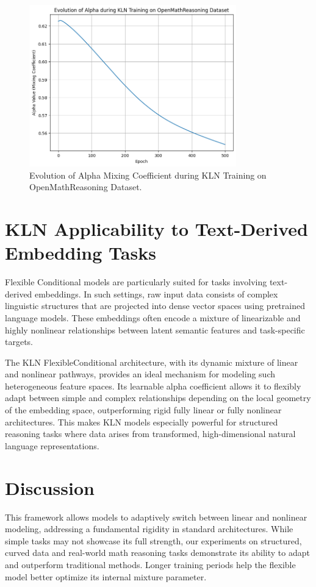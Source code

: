 \documentclass[11pt]{article}
\begin{document}
\begin{figure}[h]
\centering
\includegraphics[width=0.8\textwidth]{figures/openmath_alpha_evolution.png}
\caption{Evolution of Alpha Mixing Coefficient during KLN Training on OpenMathReasoning Dataset.}
\label{fig:openmath_alpha}
\end{figure}

\section{KLN Applicability to Text-Derived Embedding Tasks}
Flexible Conditional models are particularly suited for tasks involving text-derived embeddings. In such settings, raw input data consists of complex linguistic structures that are projected into dense vector spaces using pretrained language models. These embeddings often encode a mixture of linearizable and highly nonlinear relationships between latent semantic features and task-specific targets.

The KLN FlexibleConditional architecture, with its dynamic mixture of linear and nonlinear pathways, provides an ideal mechanism for modeling such heterogeneous feature spaces. Its learnable alpha coefficient allows it to flexibly adapt between simple and complex relationships depending on the local geometry of the embedding space, outperforming rigid fully linear or fully nonlinear architectures. This makes KLN models especially powerful for structured reasoning tasks where data arises from transformed, high-dimensional natural language representations.

\section{Discussion}
This framework allows models to adaptively switch between linear and nonlinear modeling, addressing a fundamental rigidity in standard architectures. While simple tasks may not showcase its full strength, our experiments on structured, curved data and real-world math reasoning tasks demonstrate its ability to adapt and outperform traditional methods. Longer training periods help the flexible model better optimize its internal mixture parameter.
\end{document}

